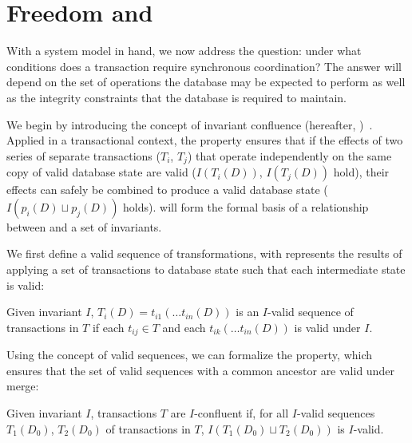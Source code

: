
\section{Freedom and \iconfluence}
\label{sec:bcc-theory}

With a system model in hand, we now address the question: under what
conditions does a transaction require synchronous coordination? The
answer will depend on the set of operations the database may be
expected to perform as well as the integrity constraints that the
database is required to maintain.

We begin by introducing the concept of invariant confluence
(hereafter, \iconfluence)~\cite{obs-confluence}. Applied in a
transactional context, the \iconfluence property ensures that if the
effects of two series of separate transactions ($T_i$, $T_j$) that
operate independently on the same copy of valid database state are
valid ($I(T_i(D))$, $I(T_j(D))$ hold), their effects can safely be
combined to produce a valid database state ($I(p_i(D) \sqcup p_j(D))$
holds). \iconfluence will form the formal basis of a relationship
between \cfreedom and a set of invariants.

We first define a valid sequence of transformations, with represents
the results of applying a set of transactions to database state such
that each intermediate state is valid:

\begin{definition}
Given invariant $I$, $T_i(D) = t_{i1}(\dots t_{in}(D))$ is an
$I$-valid sequence of transactions in $T$ if each $t_{ij} \in T$ and
each $t_{ik}(\dots t_{in}(D))$ is valid under $I$.
\end{definition}

Using the concept of valid sequences, we can formalize the
\iconfluence property, which ensures that the set of valid sequences
with a common ancestor are valid under merge:

\begin{definition}[\iconfluence]
Given invariant $I$, transactions $T$ are $I$-confluent if, for all
$I$-valid sequences $T_1(D_0)$, $T_2(D_0)$ of transactions in $T$,
$I(T_1(D_0) \sqcup T_2(D_0))$ is $I$-valid.
\end{definition}

